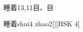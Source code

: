 \begin{entry}{睡着}{13,11}{⽬、⽬}
  \begin{phonetics}{睡着}{shui4 zhao2}[][HSK 4]
  \end{phonetics}
\end{entry}
